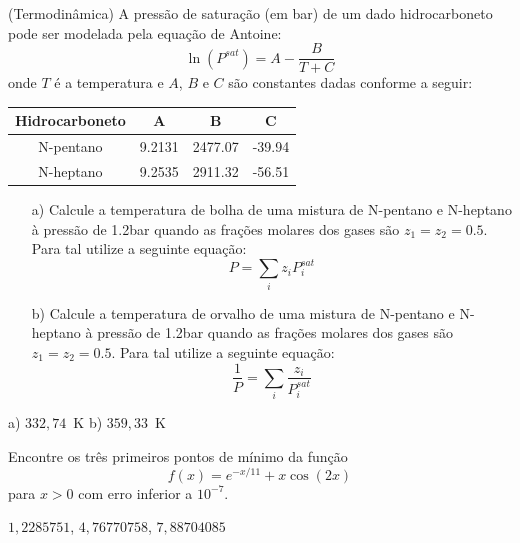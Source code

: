 \begin{exer}(Termodinâmica) A pressão de saturação (em bar) de um dado hidrocarboneto pode ser modelada pela equação de Antoine:
$$\ln\left(P^{sat}\right)=A-\frac{B}{T+C}$$
onde $T$ é a temperatura e $A$, $B$ e $C$ são constantes dadas conforme a seguir:

\begin{tabular}{|c|c|c|c|}
\hline
Hidrocarboneto&A&B&C\\
\hline
N-pentano & 9.2131 & 2477.07 & -39.94 \\
\hline
N-heptano & 9.2535 &2911.32 &-56.51 \\
\hline
\end{tabular}
\begin{itemize}
\item[a)] Calcule a temperatura de bolha de uma mistura de N-pentano e N-heptano à pressão de 1.2bar quando as frações molares  dos gases são  $z_1=z_2=0.5$. Para tal utilize a seguinte equação:
$$P=\sum_i z_i P_i^{sat}$$
\item[b)] Calcule a temperatura de orvalho de uma mistura de N-pentano e N-heptano à pressão de 1.2bar quando as frações molares  dos gases são  $z_1=z_2=0.5$. Para tal utilize a seguinte equação:
$$\frac{1}{P}=\sum_i \frac{z_i}{P_i^{sat}}$$
\end{itemize}
\end{exer}

\begin{resp}
  
 a) $332,74$~K b) $359,33$~K    
  
\end{resp}

\begin{exer} Encontre os três primeiros pontos de mínimo da função $$f(x)=e^{-x/11}+x\cos(2x)$$ para $x>0$ com erro inferior a $10^{-7}$.
\end{exer}
\begin{resp}
  
$1,2285751$, $4,76770758$, $7,88704085$
  
\end{resp}

% 
